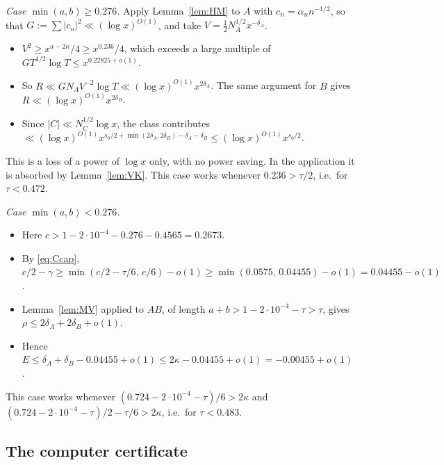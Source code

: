 \documentclass[11pt]{amsart}
\theoremstyle{definition}
\theoremstyle{remark}
\begin{document}
\emph{Case $\min(a,b)\ge0.276$.} Apply Lemma~\ref{lem:HM} to $A$ with $c_n=\alpha_nn^{-1/2}$, so that
$G:=\sum|c_n|^2\ll(\log x)^{O(1)}$, and take $V=\frac12N_A^{1/2}x^{-\delta_A}$.
\begin{itemize}[leftmargin=*]
\item $V^2\ge x^{a-2\kappa}/4\ge x^{0.236}/4$, which exceeds a large multiple of $GT^{1/2}\log T\le x^{0.22825+o(1)}$.
\item So $R\ll GN_AV^{-2}\log T\ll(\log x)^{O(1)}x^{2\delta_A}$. The same argument for $B$ gives $R\ll(\log x)^{O(1)}x^{2\delta_B}$.
\item Since $|C|\ll N_C^{1/2}\log x$, the class contributes
$\ll(\log x)^{O(1)}x^{s_0/2+\min(2\delta_A,2\delta_B)-\delta_A-\delta_B}\le(\log x)^{O(1)}x^{s_0/2}$.
\end{itemize}
This is a loss of a power of $\log x$ only, with no power saving. In the application it is absorbed by Lemma~\ref{lem:VK}.
This case works whenever $0.236>\tau/2$, i.e.\ for $\tau<0.472$.

\emph{Case $\min(a,b)<0.276$.}
\begin{itemize}[leftmargin=*]
\item Here $c>1-2\cdot10^{-4}-0.276-0.4565=0.2673$.
\item By \eqref{eq:Ccap}, $c/2-\gamma\ge\min(c/2-\tau/6,\,c/6)-o(1)\ge\min(0.0575,\,0.04455)-o(1)=0.04455-o(1)$.
\item Lemma~\ref{lem:MV} applied to $AB$, of length $a+b>1-2\cdot10^{-4}-\tau>\tau$, gives $\rho\le2\delta_A+2\delta_B+o(1)$.
\item Hence $E\le\delta_A+\delta_B-0.04455+o(1)\le2\kappa-0.04455+o(1)=-0.00455+o(1)$.
\end{itemize}
This case works whenever $(0.724-2\cdot10^{-4}-\tau)/6>2\kappa$ and $(0.724-2\cdot10^{-4}-\tau)/2-\tau/6>2\kappa$, i.e.\ for $\tau<0.483$.

\subsection{The computer certificate}\label{sec:cert}
\end{document}
